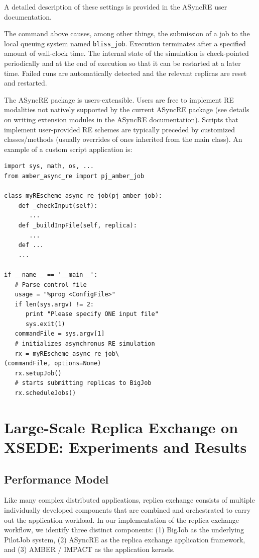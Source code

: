 \documentclass{sig-alternate}
\begin{document}
A detailed description of these settings is provided in the ASyncRE user documentation.


The command above causes, among other things, the submission of a job
to the local queuing system named \verb+bliss_job+. Execution terminates after a specified amount of
wall-clock time. The internal state of the simulation is check-pointed
periodically and at the end of execution so that it can be restarted
at a later time. Failed runs are automatically detected
and the relevant replicas are reset and restarted.

The ASyncRE package is users-extensible. Users are free to implement
RE modalities not natively supported by the current ASyncRE package
(see details on writing extension modules in the ASyncRE
documentation). Scripts that implement user-provided RE schemes are
typically preceded by customized classes/methods (usually overrides of
ones inherited from the main class). An example of a custom script application is:

\begin{lstlisting}[frame=single]
import sys, math, os, ...
from amber_async_re import pj_amber_job

class myREscheme_async_re_job(pj_amber_job):
    def _checkInput(self):
       ...
    def _buildInpFile(self, replica):
       ...
    def ...
    ...

if __name__ == '__main__':
   # Parse control file
   usage = "%prog <ConfigFile>"
   if len(sys.argv) != 2:
      print "Please specify ONE input file"
      sys.exit(1)    
   commandFile = sys.argv[1]
   # initializes asynchronus RE simulation
   rx = myREscheme_async_re_job\
(commandFile, options=None)
   rx.setupJob()
   # starts submitting replicas to BigJob
   rx.scheduleJobs()
\end{lstlisting}

\section{Large-Scale Replica Exchange on XSEDE: Experiments and
  Results}\label{sec:results}

\subsection{Performance Model}

Like many complex distributed applications, replica exchange consists of
multiple individually developed components that are combined and orchestrated to
carry out the application workload. In our implementation of the replica
exchange workflow, we identify three distinct  components: (1) BigJob as the
underlying PilotJob system, (2) ASyncRE as  the replica exchange application
framework, and (3) AMBER / IMPACT as the  application kernels.
\end{document}
